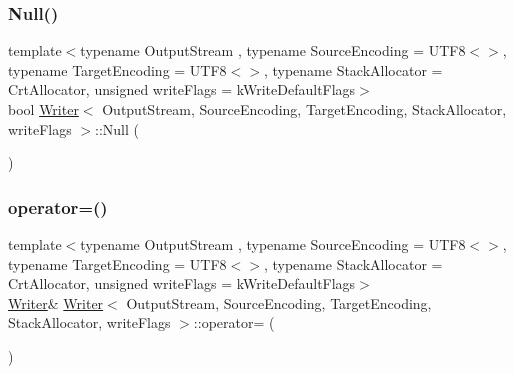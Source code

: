 \mbox{\label{classWriter_af700ed03c8810d48a4aaa3c5baeaf26c}} 
\subsubsection{\texorpdfstring{Null()}{Null()}}
{\footnotesize\ttfamily template$<$typename Output\+Stream , typename Source\+Encoding  = U\+T\+F8$<$$>$, typename Target\+Encoding  = U\+T\+F8$<$$>$, typename Stack\+Allocator  = Crt\+Allocator, unsigned write\+Flags = k\+Write\+Default\+Flags$>$ \\
bool \hyperlink{classWriter}{Writer}$<$ Output\+Stream, Source\+Encoding, Target\+Encoding, Stack\+Allocator, write\+Flags $>$\+::Null (\begin{DoxyParamCaption}{ }\end{DoxyParamCaption})\hspace{0.3cm}{\ttfamily [inline]}}

\mbox{\label{classWriter_ac033345791d1ff181715a588da16bde5}} 
\subsubsection{\texorpdfstring{operator=()}{operator=()}}
{\footnotesize\ttfamily template$<$typename Output\+Stream , typename Source\+Encoding  = U\+T\+F8$<$$>$, typename Target\+Encoding  = U\+T\+F8$<$$>$, typename Stack\+Allocator  = Crt\+Allocator, unsigned write\+Flags = k\+Write\+Default\+Flags$>$ \\
\hyperlink{classWriter}{Writer}\& \hyperlink{classWriter}{Writer}$<$ Output\+Stream, Source\+Encoding, Target\+Encoding, Stack\+Allocator, write\+Flags $>$\+::operator= (\begin{DoxyParamCaption}\item[{const \hyperlink{classWriter}{Writer}$<$ Output\+Stream, Source\+Encoding, Target\+Encoding, Stack\+Allocator, write\+Flags $>$ \&}]{ }\end{DoxyParamCaption})\hspace{0.3cm}{\ttfamily [private]}}

\mbox{\label{classWriter_a1fc40f8b9f3abc2548c0c5782ce1755d}} 
